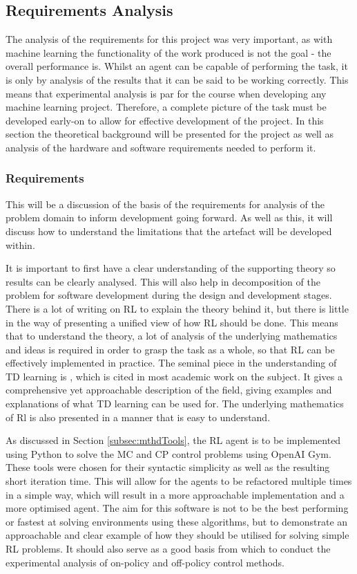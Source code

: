 \documentclass[hidelinks,journal]{IEEEtran}
\begin{document}
\subsection{Requirements Analysis}
\label{subsec:desReq}
The analysis of the requirements for this project was very important, as with machine learning the functionality of the work produced is not the goal - the overall performance is. Whilst an agent can be capable of performing the task, it is only by analysis of the results that it can be said to be working correctly. This means that experimental analysis is par for the course when developing any machine learning project. Therefore, a complete picture of the task must be developed early-on to allow for effective development of the project. In this section the theoretical background will be presented for the project as well as analysis of the hardware and software requirements needed to perform it.
\subsubsection{Requirements}
\label{subsubsec:desReqReq}
This will be a discussion of the basis of the requirements for analysis of the problem domain to inform development going forward. As well as this, it will discuss how to understand the limitations that the artefact will be developed within.

It is important to first have a clear understanding of the supporting theory so results can be clearly analysed. This will also help in decomposition of the problem for software development during the design and development stages. There is a lot of writing on RL to explain the theory behind it, but there is little in the way of presenting a unified view of how RL should be done. This means that to understand the theory, a lot of analysis of the underlying mathematics and ideas is required in order to grasp the task as a whole, so that RL can be effectively implemented in practice. The seminal piece in the understanding of TD learning is \cite[Ch. 6]{Sutton18}, which is cited in most academic work on the subject. It gives a comprehensive yet approachable description of the field, giving examples and explanations of what TD learning can be used for. The underlying mathematics of Rl is also presented in a manner that is easy to understand.

As discussed in Section \ref{subsec:mthdTools}, the RL agent is to be implemented using Python to solve the MC and CP control problems using OpenAI Gym. These tools were chosen for their syntactic simplicity as well as the resulting short iteration time. This will allow for the agents to be refactored multiple times in a simple way, which will result in a more approachable implementation and a more optimised agent. The aim for this software is not to be the best performing or fastest at solving environments using these algorithms, but to demonstrate an approachable and clear example of how they should be utilised for solving simple RL problems. It should also serve as a good basis from which to conduct the experimental analysis of on-policy and off-policy control methods.
\end{document}
